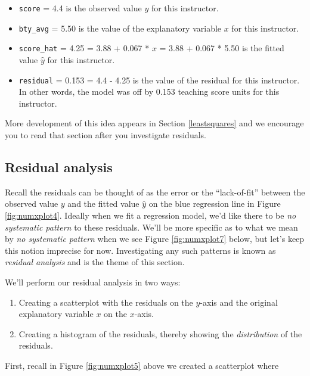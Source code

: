 \documentclass[12pt,]{krantz}
\providecommand{\tightlist}{%
  \setlength{\itemsep}{0pt}\setlength{\parskip}{0pt}}
\theoremstyle{definition}
\theoremstyle{definition}
\theoremstyle{definition}
\theoremstyle{remark}
\begin{document}
\begin{itemize}
\tightlist
\item
  \texttt{score} = 4.4 is the observed value \(y\) for this instructor.
\item
  \texttt{bty\_avg} = 5.50 is the value of the explanatory variable
  \(x\) for this instructor.
\item
  \texttt{score\_hat} = 4.25 = 3.88 + 0.067 * \(x\) = 3.88 + 0.067 *
  5.50 is the fitted value \(\widehat{y}\) for this instructor.
\item
  \texttt{residual} = 0.153 = 4.4 - 4.25 is the value of the residual
  for this instructor. In other words, the model was off by 0.153
  teaching score units for this instructor.
\end{itemize}

More development of this idea appears in Section \ref{leastsquares} and
we encourage you to read that section after you investigate residuals.

\subsection{Residual analysis}\label{model1residuals}

Recall the residuals can be thought of as the error or the
``lack-of-fit'' between the observed value \(y\) and the fitted value
\(\widehat{y}\) on the blue regression line in Figure
\ref{fig:numxplot4}. Ideally when we fit a regression model, we'd like
there to be \emph{no systematic pattern} to these residuals. We'll be
more specific as to what we mean by \emph{no systematic pattern} when we
see Figure \ref{fig:numxplot7} below, but let's keep this notion
imprecise for now. Investigating any such patterns is known as
\emph{residual analysis} and is the theme of this section.

We'll perform our residual analysis in two ways:

\begin{enumerate}
\def\labelenumi{\arabic{enumi}.}
\tightlist
\item
  Creating a scatterplot with the residuals on the \(y\)-axis and the
  original explanatory variable \(x\) on the \(x\)-axis.
\item
  Creating a histogram of the residuals, thereby showing the
  \emph{distribution} of the residuals.
\end{enumerate}

First, recall in Figure \ref{fig:numxplot5} above we created a
scatterplot where
\end{document}
